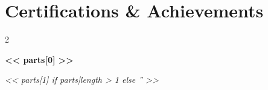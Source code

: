 \documentclass[10pt, letterpaper]{article}
\newenvironment{twocolentry}[2][]{
    \onecolentry
    \def\secondColumn{#2}
    \setcolumnwidth{\fill, 4.5 cm}
    \begin{paracol}{2}
}{
    \switchcolumn \raggedleft \secondColumn
    \end{paracol}
    \endonecolentry
}
\let\hrefWithoutArrow\href
\renewcommand{\href}[2]{\hrefWithoutArrow{#1}{\ifthenelse{\equal{#2}{}}{ }{#2 }\raisebox{.15ex}{\footnotesize \faExternalLink}}}
\begin{document}
    \section{Certifications \& Achievements}
        \begin{samepage}
                \begin{twocolentry}{
                    \textit{<< parts[1] if parts|length > 1 else '' >>}}
                    \textbf{<< parts[0] >>}
                \end{twocolentry}
        \end{samepage}
\end{document}
